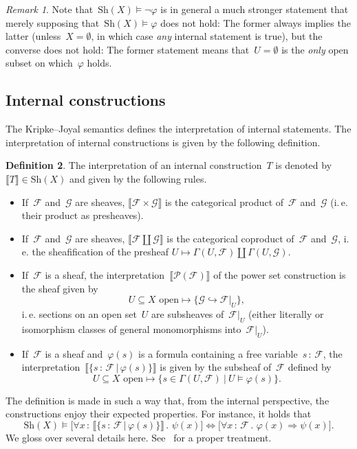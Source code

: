 \documentclass[10pt]{amsart}
\makeatletter
\theoremstyle{definition}
\newtheorem{defn}{Definition}[section]
\theoremstyle{plain}
\theoremstyle{remark}
\newtheorem{rem}[defn]{Remark}
\newcommand{\F}{\mathcal{F}}
\newcommand{\G}{\mathcal{G}}
\renewcommand{\P}{\mathcal{P}}
\newcommand{\Sh}{\mathrm{Sh}}
\newcommand{\?}{\,{:}\,}
\renewcommand{\_}{\mathpunct{.}\,}
\newcommand{\brak}[1]{{\llbracket{#1}\rrbracket}}
\newcommand{\ie}{i.\,e.\@\xspace}
\makeatother
\begin{document}
\begin{rem}Note that~$\Sh(X) \models \neg\varphi$ is in general a much stronger
statement that merely supposing that~$\Sh(X) \models \varphi$ does not hold:
The former always implies the latter (unless~$X = \emptyset$, in which case
\emph{any} internal statement is true), but the converse does not hold: The
former statement means that~$U = \emptyset$ is the \emph{only} open subset on
which~$\varphi$ holds.\end{rem}


\subsection{Internal constructions} The Kripke--Joyal semantics defines the
interpretation of internal statements. The interpretation of internal
constructions is given by the following definition.

\begin{defn}The interpretation of an internal construction~$T$
is denoted by~$\brak{T} \in \Sh(X)$ and given by the following rules.
\begin{itemize}\item If~$\F$ and~$\G$ are sheaves, $\brak{\F \times \G}$ is the
categorical product of~$\F$ and~$\G$ (\ie their product as presheaves).
\item If~$\F$ and~$\G$ are sheaves, $\brak{\F \amalg \G}$ is the categorical
coproduct of~$\F$ and~$\G$, \ie the sheafification of the presheaf
$U \mapsto \Gamma(U,\F) \amalg \Gamma(U,\G)$.
\item If~$\F$ is a sheaf, the interpretation~$\brak{\P(\F)}$ of the power set
construction is the sheaf given by
\[ \text{$U \subseteq X$ open} \longmapsto \{ \G \hookrightarrow \F|_U \}, \]
\ie sections on an open set~$U$ are subsheaves of~$\F|_U$ (either literally
or isomorphism classes of general monomorphisms into~$\F|_U$).
\item If~$\F$ is a sheaf and~$\varphi(s)$ is a formula containing a free
variable~$s\?\F$, the interpretation~$\brak{\{s\?\F\,|\,\varphi(s)\}}$ is given
by the subsheaf of~$\F$ defined by
\[ \text{$U \subseteq X$ open} \longmapsto \{ s \in \Gamma(U,\F) \ |\ 
  U \models \varphi(s) \}. \]
\end{itemize}
\end{defn}

The definition is made in such a way that, from the internal perspective, the
constructions enjoy their expected properties. For instance, it holds that
\[ \Sh(X) \models
  \bigl[\forall x\?\brak{\{s\?\F \,|\, \varphi(s)\}}\_ \psi(x)\bigr]
  \Longleftrightarrow
  \bigl[\forall x\?\F\_ \varphi(x) \Rightarrow \psi(x)\bigr]. \]
We gloss over several details here. See~\cite[???]{johnstone:elephant} for
a proper treatment.
\end{document}
